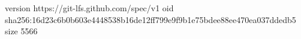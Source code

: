 version https://git-lfs.github.com/spec/v1
oid sha256:16d23c6b0b603e4448538b16de12ff799e9f9b1e75bdee88ee470ea037ddedb5
size 5566
